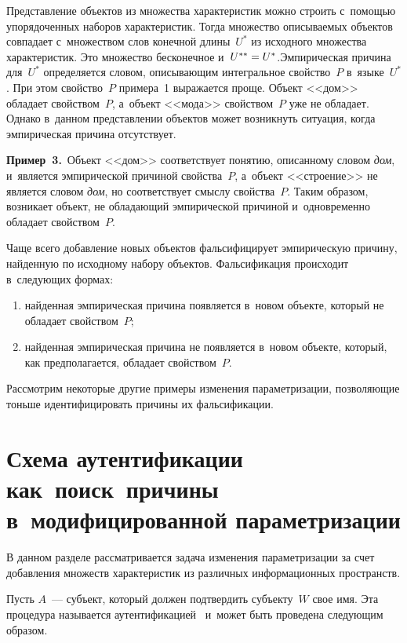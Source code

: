 \begin{multicols}{2}
  Представление объектов из множества характеристик можно строить 
с~помощью упорядоченных\linebreak
 наборов характеристик. Тогда множество 
описываемых объектов совпадает с~множеством слов ко\-нечной длины~$U^*$ из 
исходного множества характеристик. Это множество бесконечное 
и~$U^{**}\hm=U^*$.\linebreak Эмпирическая причина для~$U^*$ определяется словом, 
описывающим интегральное свойство~$P$ в~языке~$U^*$. При этом 
свойство~$P$ примера~1 выражается проще. Объект <<дом>> обладает 
свойством~$P$, а~объект <<мода>> свойством~$P$ уже не обладает. Однако 
в~данном представлении объектов может возникнуть ситуация, когда 
эмпирическая причина отсутствует.
  
  \smallskip
  
  
  \noindent
  \textbf{Пример~3.}\ Объект <<дом>> соответствует понятию, описанному 
словом \textit{дом}, и~является эмпирической причиной свойства~$P$, а~объект 
<<строение>> не является словом \textit{дом}, но соответствует смыслу 
свойства~$P$. Таким образом, возникает объект, не обладающий эмпирической 
причиной и~одновременно обладает свойством~$P$.
  
  \smallskip
  
  Чаще всего добавление новых объектов фальсифицирует эмпирическую 
причину, найденную по исходному набору объектов. Фальсификация происходит 
в~следующих формах:
  \begin{enumerate}[(1)]
\item найденная эмпирическая причина появляется в~новом объекте, который не 
обладает свойством~$P$;
\item найденная эмпирическая причина не появляется в~новом объекте, который, 
как предполагается, обладает свойством~$P$.
\end{enumerate}

  Рассмотрим некоторые другие примеры изменения параметризации, 
позволяющие тоньше идентифицировать причины их фальсификации.
  
\section{Схема аутентификации как~поиск~причины 
в~модифицированной параметризации}

  В данном разделе рассматривается задача изменения параметризации за счет 
добавления множеств характеристик из различных информационных пространств.
  
  Пусть $A$~--- субъект, который должен подтвердить субъекту~$W$ свое имя. 
Эта процедура называется аутентификацией~\cite{5-gr} и~может быть проведена 
следующим образом.
  

\end{multicols}
